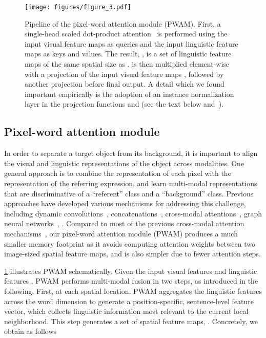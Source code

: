 \documentclass[10pt,twocolumn,letterpaper]{article}
\begin{document}
\begin{figure}[t]
\centering
\texttt{[image: figures/figure\_3.pdf]}
\vspace{8pt}
\caption{Pipeline of the pixel-word attention module (PWAM). First, a single-head scaled dot-product attention~\cite{attention-all-you-need} is performed using the input visual feature maps  as queries and the input linguistic feature maps  as keys and values. The result, , is a set of linguistic feature maps of the same spatial size as .  is then multiplied element-wise with a projection of the input visual feature maps , followed by another projection before final output. A detail which we found important empirically is the adoption of an instance normalization~\cite{ulyanov2016instance} layer in the projection functions  and  (see the text below and~).}
\label{fig:3}
\end{figure}


\subsection{Pixel-word attention module}
\label{sec:pwam}
In order to separate a target object from its background, it is important to align the visual and linguistic representations of the object across modalities.
One general approach is to combine the representation of each pixel with the representation of the referring expression, and learn multi-modal representations that are discriminative of a ``referent'' class and a ``background'' class.
Previous approaches have developed various mechanisms for addressing this challenge, including dynamic convolutions~\cite{margffoy2018dynamic}, concatenations~\cite{hu2016segmentation,margffoy2018dynamic,Li2018rrn}, cross-modal attentions~\cite{shi2018key,ye2019cross,hu2020brinet,luo2020cascade,EFN}, graph neural networks~\cite{liu2021cmpc}, \etc.
Compared to most of the previous cross-modal attention mechanisms~\cite{shi2018key,ye2019cross,hu2020brinet,luo2020cascade,EFN}, our pixel-word attention module (PWAM) produces a much smaller memory footprint as it avoids computing attention weights between two image-sized spatial feature maps, and is also simpler due to fewer attention steps.

\cref{fig:3} illustrates PWAM schematically.
Given the input visual features  and linguistic features , PWAM performs multi-modal fusion in two steps, as introduced in the following.
First, at each spatial location, PWAM aggregates the linguistic features  across the word dimension to generate a position-specific, sentence-level feature vector, which collects linguistic information most relevant to the current local neighborhood.
This step generates a set of spatial feature maps, .
Concretely, we obtain  as follows
\end{document}
